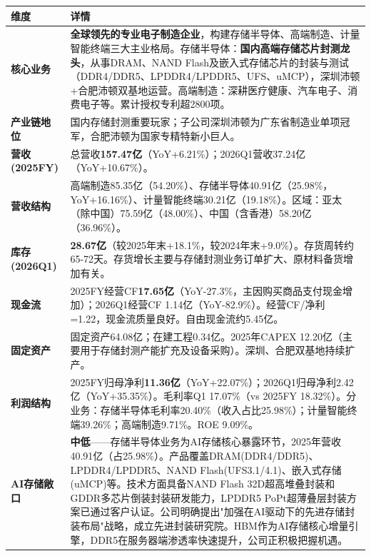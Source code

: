 \begin{exhibitbox}
\centering
\scriptsize
\renewcommand{\arraystretch}{1.20}
\begin{tabularx}{\exhibitboxwidth}{>{\bfseries}p{2.2cm} >{\raggedright\arraybackslash\sloppy\hspace{0pt}}X}
\toprule
\textbf{维度} & \textbf{详情} \\
\midrule
核心业务 & \textbf{全球领先的专业电子制造企业}，构建存储半导体、高端制造、计量智能终端三大主业格局。存储半导体：\textbf{国内高端存储芯片封测龙头}，从事DRAM、NAND Flash及嵌入式存储芯片的封装与测试（DDR4/DDR5、LPDDR4/LPDDR5、UFS、uMCP），深圳沛顿+合肥沛顿双基地运营。高端制造：深耕医疗健康、汽车电子、消费电子等。累计授权专利超2800项。 \\
产业链地位 & 国内存储封测重要玩家；子公司深圳沛顿为广东省制造业单项冠军，合肥沛顿为国家专精特新小巨人。 \\
营收(2025FY) & 总营收\textbf{157.47亿}（YoY+6.21\%）；2026Q1营收37.24亿（YoY+10.67\%）。 \\
营收结构 & 高端制造85.35亿（54.20\%）、存储半导体40.91亿（25.98\%，YoY+16.16\%）、计量智能终端30.21亿（19.18\%）。区域：亚太（除中国）75.59亿（48.00\%）、中国（含香港）58.20亿（36.96\%）。 \\
库存(2026Q1) & \textbf{28.67亿}（较2025年末+18.1\%，较2024年末+9.0\%）。存货周转约65-72天。存货增长主要与存储封测业务订单扩大、原材料备货增加有关。 \\
现金流 & 2025FY经营CF\textbf{17.65亿}（YoY-27.3\%，主因购买商品支付现金增加）；2026Q1经营CF 1.14亿（YoY-82.9\%）。经营CF/净利=1.22，现金流质量良好。自由现金流约5.45亿。 \\
固定资产 & 固定资产64.08亿；在建工程0.34亿。2025年CAPEX 12.20亿（主要用于存储封测产能扩充及设备采购）。深圳、合肥双基地持续扩产。 \\
利润结构 & 2025FY归母净利\textbf{11.36亿}（YoY+22.07\%）；2026Q1归母净利2.42亿（YoY+35.35\%）。毛利率Q1 17.07\%（vs 2025FY 18.32\%）。分业务：存储半导体毛利率20.40\%（收入占比25.98\%）；计量智能终端39.26\%；高端制造9.71\%。ROE 9.09\%。 \\
AI存储敞口 & \textbf{中低}——存储半导体业务为AI存储核心暴露环节，2025年营收40.91亿（占25.98\%）。产品覆盖DRAM(DDR4/DDR5)、LPDDR4/LPDDR5、NAND Flash(UFS3.1/4.1)、嵌入式存储(uMCP)等。技术方面具备NAND Flash 32D超高堆叠封装和GDDR多芯片倒装封装研发能力，LPDDR5 PoPt超薄叠层封装方案已通过客户认证。公司明确提出"加强在AI驱动下的先进存储封装布局"战略，成立先进封装研究院。HBM作为AI存储核心增量引擎，DDR5在服务器端渗透率快速提升，公司正积极把握机遇。 \\
\bottomrule
\end{tabularx}
\end{exhibitbox}

